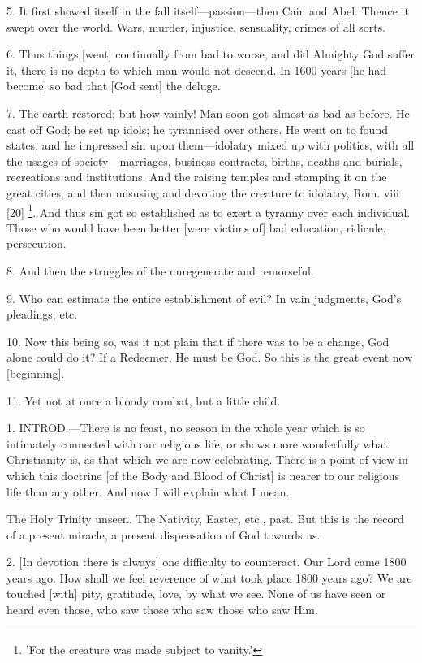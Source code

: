 5. It first showed itself in the fall
itself—passion—then Cain and Abel. Thence it swept over the world.
Wars, murder, injustice, sensuality, crimes of all sorts.

6. Thus things [went] continually from bad to
worse, and did Almighty God suffer it, there is no depth to which man
would not descend. In 1600 years [he had become] so bad that [God
sent] the deluge.

7. The earth restored; but how vainly! Man soon
got almost as bad as before. He cast off God; he set up idols; he
tyrannised over others. He went on to found states, and he impressed
sin upon them—idolatry mixed up with politics, with all the usages
of society—marriages, business contracts, births, deaths and
burials, recreations and institutions. And the raising temples and
stamping it on the great cities, and then misusing and devoting the
creature to idolatry, Rom. viii. [20] \footnote{'For the creature was made
subject to vanity.'}. And thus sin got so established as to exert a tyranny
over each individual. Those who would have been better [were victims
of] bad education, ridicule, persecution.

8. And then the struggles of the unregenerate and
remorseful.

9. Who can estimate the entire establishment of
evil? In vain judgments, God's pleadings, etc.

10. Now this being so, was it not plain that if
there was to be a change, God alone could do it? If a Redeemer, He
must be God. So this is the great event now [beginning].

11. Yet not at once a bloody combat, but a little
child.


1. INTROD.—There
is no feast, no season in the whole year which is so intimately
connected with our religious life, or shows more wonderfully what
Christianity is, as that which we are now celebrating. There is a
point of view in which this doctrine [of the Body and Blood of Christ]
is nearer to our religious life than any other. And now I will explain
what I mean.

The Holy Trinity unseen. The Nativity, Easter,
etc., past. But this is the record of a present miracle, a present
dispensation of God towards us.

2. [In devotion there is always] one difficulty
to counteract. Our Lord came 1800 years ago. How shall we feel
reverence of what took place 1800 years ago? We are touched [with]
pity, gratitude, love, by what we see. None of us have seen or heard
even those, who saw those who saw those who saw Him.

